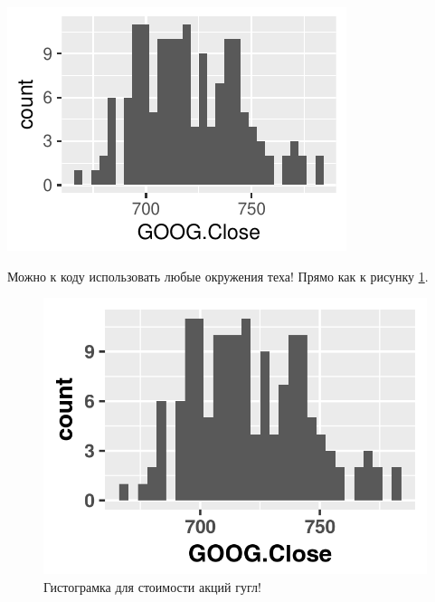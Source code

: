\documentclass[12pt, a4paper]{article}\usepackage[]{graphicx}\usepackage[]{color}
\makeatletter
\def\maxwidth{ %
  \ifdim\Gin@nat@width>\linewidth
    \linewidth
  \else
    \Gin@nat@width
  \fi
}
\newenvironment{knitrout}{}{} %
\makeatother
\begin{document}
\begin{knitrout}
\color{fgcolor}

{\centering \includegraphics[width=\maxwidth]{figure/unnamed-chunk-7-1} 

}



\end{knitrout}

Можно к коду использовать любые окружения теха! Прямо как к рисунку \ref{fig}.

\begin{figure}[h!]
\begin{knitrout}
\color{fgcolor}

{\centering \includegraphics[width=\maxwidth]{figure/unnamed-chunk-8-1} 

}



\end{knitrout}
\caption{Гистограмка для стоимости акций гугл! \label{fig}}
\end{figure}
\end{document}
